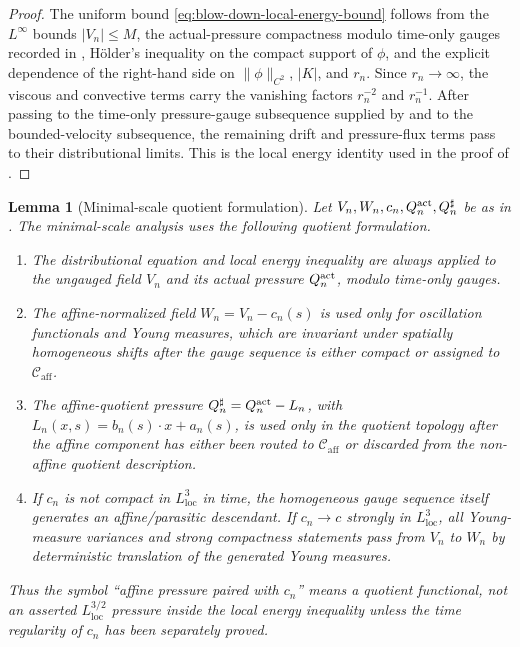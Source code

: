 \documentclass[11pt]{amsart}
\numberwithin{equation}{section}
\theoremstyle{plain}
\newtheorem{lemma}[lemma]{Lemma}
\theoremstyle{definition}
\theoremstyle{remark}
\newcommand{\loc}{\mathrm{loc}}
\newcommand{\Caff}{\mathcal C_{\mathrm{aff}}}
\begin{document}
\begin{proof}
The uniform bound \eqref{eq:blow-down-local-energy-bound} follows from the
\(L^\infty\) bounds \(|V_n|\le M\), the actual-pressure compactness modulo
time-only gauges recorded in
, H\"older's inequality on the
compact support of \(\phi\), and the explicit dependence of the right-hand
side on \(\|\phi\|_{C^2}\), \(|K|\), and \(r_n\).  Since \(r_n\to\infty\), the
viscous and convective terms carry the vanishing factors \(r_n^{-2}\) and
\(r_n^{-1}\).  After passing to the time-only pressure-gauge subsequence
supplied by  and to the bounded-velocity
subsequence, the remaining drift and pressure-flux terms pass to their
distributional limits.  This is the local energy identity used in the proof of
.
\end{proof}

\begin{lemma}[Minimal-scale quotient formulation]
\label{lem:first-bad-quotient-formulation}
Let \(V_n,W_n,c_n,Q_n^{\rm act},Q_n^\sharp\) be as in
.  The minimal-scale analysis uses the
following quotient formulation.
\begin{enumerate}[label=\textup{(\roman*)}]
   \item The distributional equation and local energy inequality are always
   applied to the ungauged field \(V_n\) and its actual pressure
   \(Q_n^{\rm act}\), modulo time-only gauges.
   \item The affine-normalized field \(W_n=V_n-c_n(s)\) is used only for
   oscillation functionals and Young measures, which are invariant under
   spatially homogeneous shifts after the gauge sequence is either compact or
   assigned to \(\Caff\).
   \item The affine-quotient pressure \(Q_n^\sharp=Q_n^{\rm act}-L_n\), with
   \(L_n(x,s)=b_n(s)\cdot x+a_n(s)\), is used only in the quotient topology
   after the affine component has either been routed to \(\Caff\) or discarded
   from the non-affine quotient description.
   \item If \(c_n\) is not compact in \(L^3_{\loc}\) in time, the homogeneous
   gauge sequence itself generates an affine/parasitic descendant.  If
   \(c_n\to c\) strongly in \(L^3_{\loc}\), all Young-measure variances and
   strong compactness statements pass from \(V_n\) to \(W_n\) by deterministic
   translation of the generated Young measures.
\end{enumerate}
Thus the symbol ``affine pressure paired with \(c_n\)'' means a quotient
functional, not an asserted \(L^{3/2}_{\loc}\) pressure inside the local energy
inequality unless the time regularity of \(c_n\) has been separately proved.
\end{lemma}
\end{document}
